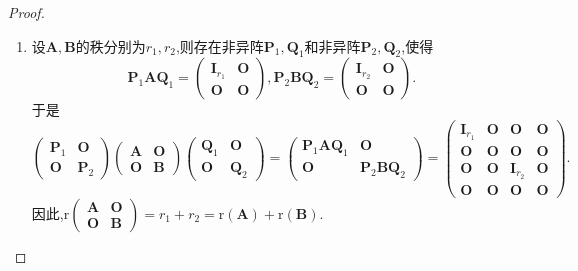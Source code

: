\documentclass[../../main.tex]{subfiles}%
\begin{document}
\begin{proof}
\begin{enumerate}[(1)]
\item  设\(\boldsymbol{A},\boldsymbol{B}\)的秩分别为\(r_1,r_2\),则存在非异阵\(\boldsymbol{P}_1,\boldsymbol{Q}_1\)和非异阵\(\boldsymbol{P}_2,\boldsymbol{Q}_2\),使得
\[
\boldsymbol{P}_1\boldsymbol{A}\boldsymbol{Q}_1=\begin{pmatrix}
\boldsymbol{I}_{r_1}&\boldsymbol{O}\\
\boldsymbol{O}&\boldsymbol{O}
\end{pmatrix}, \boldsymbol{P}_2\boldsymbol{B}\boldsymbol{Q}_2=\begin{pmatrix}
\boldsymbol{I}_{r_2}&\boldsymbol{O}\\
\boldsymbol{O}&\boldsymbol{O}
\end{pmatrix}.
\]
于是
\[
\begin{pmatrix}
\boldsymbol{P}_1&\boldsymbol{O}\\
\boldsymbol{O}&\boldsymbol{P}_2
\end{pmatrix}
\begin{pmatrix}
\boldsymbol{A}&\boldsymbol{O}\\
\boldsymbol{O}&\boldsymbol{B}
\end{pmatrix}
\begin{pmatrix}
\boldsymbol{Q}_1&\boldsymbol{O}\\
\boldsymbol{O}&\boldsymbol{Q}_2
\end{pmatrix}=
\begin{pmatrix}
\boldsymbol{P}_1\boldsymbol{A}\boldsymbol{Q}_1&\boldsymbol{O}\\
\boldsymbol{O}&\boldsymbol{P}_2\boldsymbol{B}\boldsymbol{Q}_2
\end{pmatrix}=
\begin{pmatrix}
\boldsymbol{I}_{r_1}&\boldsymbol{O}&\boldsymbol{O}&\boldsymbol{O}\\
\boldsymbol{O}&\boldsymbol{O}&\boldsymbol{O}&\boldsymbol{O}\\
\boldsymbol{O}&\boldsymbol{O}&\boldsymbol{I}_{r_2}&\boldsymbol{O}\\
\boldsymbol{O}&\boldsymbol{O}&\boldsymbol{O}&\boldsymbol{O}
\end{pmatrix}.
\]
因此,\(\mathrm{r}\begin{pmatrix}
\boldsymbol{A}&\boldsymbol{O}\\
\boldsymbol{O}&\boldsymbol{B}
\end{pmatrix}=r_1 + r_2=\mathrm{r}(\boldsymbol{A})+\mathrm{r}(\boldsymbol{B})\).


\end{enumerate}
\end{proof}
\end{document}
